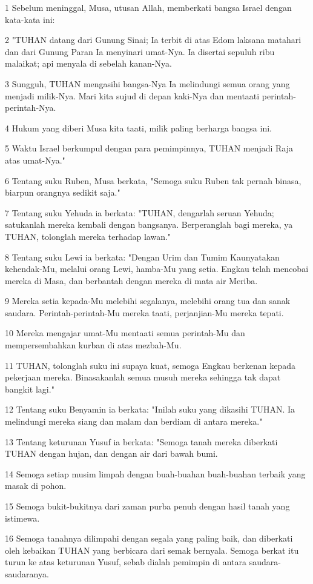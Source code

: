 \par 1 Sebelum meninggal, Musa, utusan Allah, memberkati bangsa Israel dengan kata-kata ini:
\par 2 "TUHAN datang dari Gunung Sinai; Ia terbit di atas Edom laksana matahari dan dari Gunung Paran Ia menyinari umat-Nya. Ia disertai sepuluh ribu malaikat; api menyala di sebelah kanan-Nya.
\par 3 Sungguh, TUHAN mengasihi bangsa-Nya Ia melindungi semua orang yang menjadi milik-Nya. Mari kita sujud di depan kaki-Nya dan mentaati perintah-perintah-Nya.
\par 4 Hukum yang diberi Musa kita taati, milik paling berharga bangsa ini.
\par 5 Waktu Israel berkumpul dengan para pemimpinnya, TUHAN menjadi Raja atas umat-Nya."
\par 6 Tentang suku Ruben, Musa berkata, "Semoga suku Ruben tak pernah binasa, biarpun orangnya sedikit saja."
\par 7 Tentang suku Yehuda ia berkata: "TUHAN, dengarlah seruan Yehuda; satukanlah mereka kembali dengan bangsanya. Berperanglah bagi mereka, ya TUHAN, tolonglah mereka terhadap lawan."
\par 8 Tentang suku Lewi ia berkata: "Dengan Urim dan Tumim Kaunyatakan kehendak-Mu, melalui orang Lewi, hamba-Mu yang setia. Engkau telah mencobai mereka di Masa, dan berbantah dengan mereka di mata air Meriba.
\par 9 Mereka setia kepada-Mu melebihi segalanya, melebihi orang tua dan sanak saudara. Perintah-perintah-Mu mereka taati, perjanjian-Mu mereka tepati.
\par 10 Mereka mengajar umat-Mu mentaati semua perintah-Mu dan mempersembahkan kurban di atas mezbah-Mu.
\par 11 TUHAN, tolonglah suku ini supaya kuat, semoga Engkau berkenan kepada pekerjaan mereka. Binasakanlah semua musuh mereka sehingga tak dapat bangkit lagi."
\par 12 Tentang suku Benyamin ia berkata: "Inilah suku yang dikasihi TUHAN. Ia melindungi mereka siang dan malam dan berdiam di antara mereka."
\par 13 Tentang keturunan Yusuf ia berkata: "Semoga tanah mereka diberkati TUHAN dengan hujan, dan dengan air dari bawah bumi.
\par 14 Semoga setiap musim limpah dengan buah-buahan buah-buahan terbaik yang masak di pohon.
\par 15 Semoga bukit-bukitnya dari zaman purba penuh dengan hasil tanah yang istimewa.
\par 16 Semoga tanahnya dilimpahi dengan segala yang paling baik, dan diberkati oleh kebaikan TUHAN yang berbicara dari semak bernyala. Semoga berkat itu turun ke atas keturunan Yusuf, sebab dialah pemimpin di antara saudara-saudaranya.
